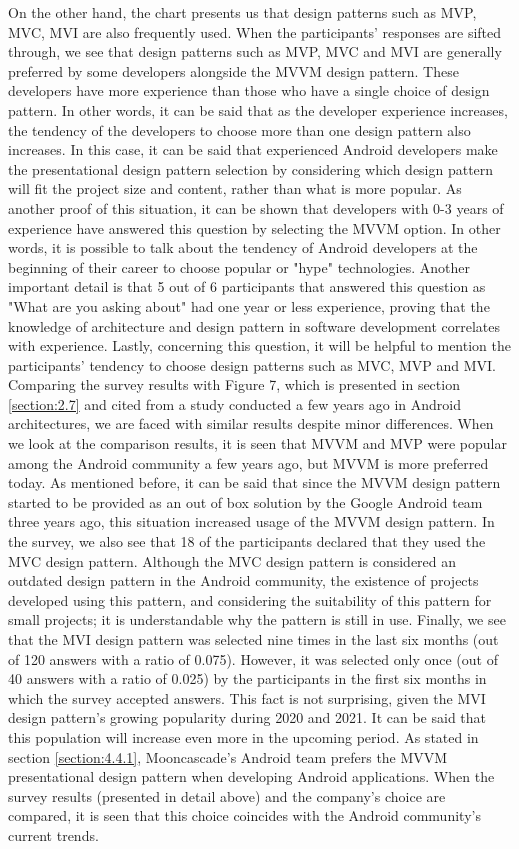 On the other hand, the chart presents us that design patterns such as MVP, MVC, MVI are also frequently used. When the participants' responses are sifted through, we see that design patterns such as MVP, MVC and MVI are generally preferred by some developers alongside the MVVM design pattern. These developers have more experience than those who have a single choice of design pattern. In other words,  it can be said that as the developer experience increases, the tendency of the developers to choose more than one design pattern also increases. In this case, it can be said that experienced Android developers make the presentational design pattern selection by considering which design pattern will fit the project size and content, rather than what is more popular. As another proof of this situation, it can be shown that developers with 0-3 years of experience have answered this question by selecting the MVVM option. In other words, it is possible to talk about the tendency of Android developers at the beginning of their career to choose popular or "hype" technologies. Another important detail is that 5 out of 6 participants that answered this question as "What are you asking about" had one year or less experience, proving that the knowledge of architecture and design pattern in software development correlates with experience. Lastly, concerning this question, it will be helpful to mention the participants’ tendency to choose design patterns such as MVC, MVP and MVI. Comparing the survey results with Figure 7, which is presented in section \ref{section:2.7} and cited from a study conducted a few years ago in Android architectures, we are faced with similar results despite minor differences. When we look at the comparison results, it is seen that MVVM and MVP were popular among the Android community a few years ago, but MVVM is more preferred today. As mentioned before, it can be said that since the MVVM design pattern started to be provided as an out of box solution by the Google Android team three years ago, this situation increased usage of the MVVM design pattern. In the survey, we also see that 18 of the participants declared that they used the MVC design pattern. Although the MVC design pattern is considered an outdated design pattern in the Android community, the existence of projects developed using this pattern, and considering the suitability of this pattern for small projects; it is understandable why the pattern is still in use. Finally, we see that the MVI design pattern was selected nine times in the last six months (out of 120 answers with a ratio of 0.075). However, it was selected only once (out of 40 answers with a ratio of 0.025) by the participants in the first six months in which the survey accepted answers. This fact is not surprising, given the MVI design pattern’s growing popularity during 2020 and 2021. It can be said that this population will increase even more in the upcoming period. As stated in section \ref{section:4.4.1}, Mooncascade's Android team prefers the MVVM presentational design pattern when developing Android applications. When the survey results (presented in detail above) and the company's choice are compared, it is seen that this choice coincides with the Android community’s current trends.

